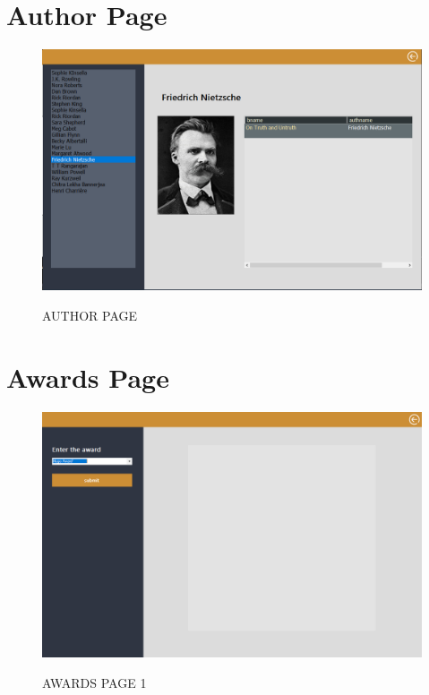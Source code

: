 \section{Author Page}
\begin{figure}[H]
\centering
\caption{AUTHOR PAGE}
\includegraphics[scale=.5]{./ssauthors.png}
\\[0.2in]
\label{fig:auth}
\end{figure}
\thispagestyle{fancy}
\section{Awards Page}
\begin{figure}[H]
\centering
\caption{AWARDS PAGE 1}
\includegraphics[scale=.5]{./ssawards1.png}
\\[0.2in]
\label{fig:award}
\end{figure}
\thispagestyle{fancy}
